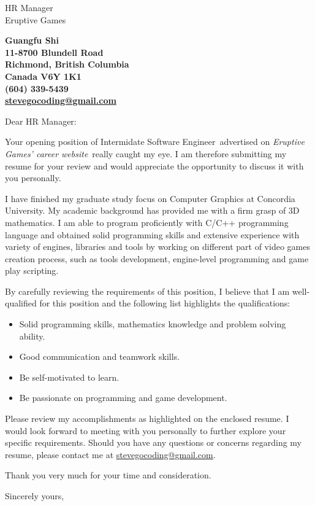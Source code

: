 \documentclass{letter}
\makeatletter
\newcommand{\phcompanyname}             {Eruptive Games}
\newcommand{\clcontactname}         {HR Manager}
\newcommand{\clcompanyname}         {\phcompanyname}
\newcommand{\cljobpostedtitle}      {Intermidate Software Engineer}
\newcommand{\cljobpostedplace}      {Eruptive Games' career website}
\newcommand{\clmyname}              {Guangfu Shi}
\newcommand{\clmyaddr}              {11-8700 Blundell Road \\ Richmond, British Columbia \\ Canada V6Y 1K1}
\newcommand{\clmyemail}             {\href{mailto:stevegocoding@gmail.com}{stevegocoding@gmail.com}}
\newcommand{\clmyphone}             {(604) 339-5439}
\makeatother
\begin{document}
\begin{letter}{\clcontactname \\ \clcompanyname}

\begin{center}
    \large\bf\clmyname              \\ 
    \clmyaddr                       \\
    \clmyphone                      \\ 
    \clmyemail                     
\end{center}

\vfill %

\opening{Dear \clcontactname:}

Your opening position of \cljobpostedtitle\ advertised on \emph{\cljobpostedplace}\ really caught my eye. 
I am therefore submitting my resume for your review and would appreciate the opportunity to discuss it with you personally.

I have finished my graduate study focus on Computer Graphics at Concordia University. My academic background has provided me with a firm grasp of 3D mathematics. I am able to program proficiently with C/C++ programming language and obtained solid programming skills and extensive experience with variety of engines, libraries and tools by working on different part of video games creation process, such as tools development, engine-level programming and game play scripting.

By carefully reviewing the requirements of this position, I believe that I am well-qualified for this position and the following list highlights the qualifications:

\begin{itemize}
        \item Solid programming skills, mathematics knowledge and problem solving ability.
        \item Good communication and teamwork skills.
        \item Be self-motivated to learn.
        \item Be passionate on programming and game development.
\end{itemize}

Please review my accomplishments as highlighted on the enclosed resume. I would look forward to meeting with you personally to further explore your specific requirements. Should you have any questions or concerns regarding my resume, please contact me at \clmyemail. 

Thank you very much for your time and consideration. 

\closing{Sincerely yours,} 
\end{letter}
\end{document}
